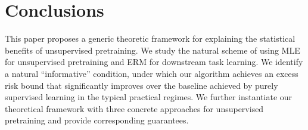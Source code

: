 \section{Conclusions}
This paper proposes a generic theoretic framework for explaining the statistical benefits of unsupervised pretraining.
We study the natural scheme of using MLE for unsupervised pretraining and ERM for downstream task learning. We identify a natural ``informative'' condition, under which our algorithm achieves an excess risk bound that significantly improves over the baseline achieved by purely supervised learning in the typical practical regimes.
We further instantiate our theoretical framework with three concrete approaches for unsupervised pretraining and provide corresponding guarantees.
